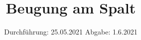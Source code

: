

\subject{V406}
\title{Beugung am Spalt}
\date{%
  Durchführung: 25.05.2021
  \hspace{3em}
  Abgabe: 1.6.2021
}



\maketitle
\thispagestyle{empty}
\tableofcontents
\newpage







\printbibliography{}


